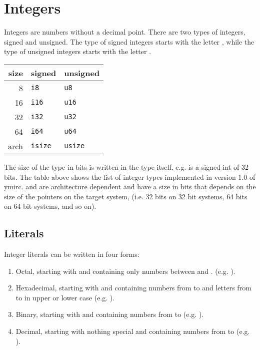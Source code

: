 \section{Integers}
\label{sec:orga8b7d2e}

Integers are numbers without a decimal point. There are two types of integers,
signed and unsigned. The type of signed integers starts with the letter
, while the type of unsigned integers starts with the letter
.

\begin{center}
  \begin{tabular}{|r|ll|}
    \hline
    size & signed & unsigned\\[0pt]
    \hline
    \hline
    8 & \texttt{i8} & \texttt{u8}\\[0pt]
    16 & \texttt{i16} & \texttt{u16}\\[0pt]
    32 & \texttt{i32} & \texttt{u32}\\[0pt]
    64 & \texttt{i64} & \texttt{u64}\\[0pt]
    arch & \texttt{isize} & \texttt{usize}\\[0pt]
    \hline
  \end{tabular}
\end{center}

The size of the type in bits is written in the type itself, e.g.  is
a signed int of 32 bits. The table above shows the list of integer types
implemented in version 1.0 of ymirc.  and  are
architecture dependent and have a size in bits that depends on the size of the
pointers on the target system, (i.e. 32 bits on 32 bit systems, 64 bits on 64
bit systems, and so on).


\vspace{-10pt}%
\subsection{Literals}
\label{sec:org2cf045d}

Integer literals can be written in four forms:
\begin{enumerate}
\item Octal, starting with  and containing only numbers between  and . (e.g. ).
  \vspace{-2pt}%
\item Hexadecimal, starting with  and containing numbers from
   to  and letters from  to  in upper or
  lower case (e.g. ).
  \vspace{-2pt}%
\item Binary, starting with  and containing numbers from  to
   (e.g. ).
  \vspace{-2pt}%
\item Decimal, starting with nothing special and containing numbers from
   to  (e.g. ).
\end{enumerate}

